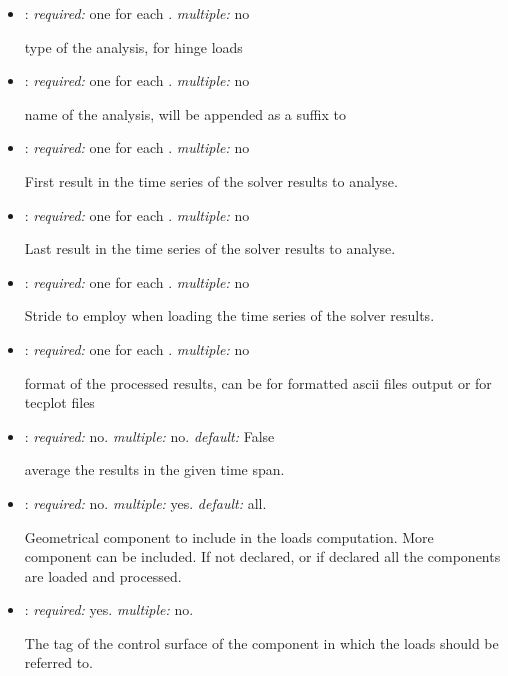 \begin{itemize}
\item {}: \textit{required:} one for each . \textit{multiple:} no

type of the analysis,  for hinge loads

\item {}: \textit{required:} one for each . \textit{multiple:} no

name of the analysis, will be appended as a suffix to 

\item {}: \textit{required:} one for each . \textit{multiple:} no

First result in the time series of the solver results to analyse.

\item {}: \textit{required:} one for each . \textit{multiple:} no

Last result in the time series of the solver results to analyse.

\item {}: \textit{required:} one for each . \textit{multiple:} no

Stride to employ when loading the time series of the solver results. 

\item {}: \textit{required:} one for each . \textit{multiple:} no

format of the processed results, can be  for formatted ascii files output or 
 for tecplot  files

\item {}: \textit{required:} no. \textit{multiple:} no. \textit{default:} False

average the results in the given time span.

\item {}: \textit{required:} no. \textit{multiple:} yes. \textit{default:} all.

Geometrical component to include in the loads computation. More component can be included. 
If not declared, or if declared  all the components are loaded and processed. 

\item {}: \textit{required:} yes. \textit{multiple:} no.

The tag of the control surface of the component in which the loads should be referred to. 

\end{itemize}

